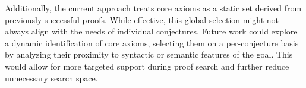 \documentclass[english,version-2020-11]{uzl-thesis}
\begin{document}
Additionally, the current approach treats core axioms as a static set derived from previously successful proofs. While effective, this global selection might not always align with the needs of individual conjectures. Future work could explore a dynamic identification of core axioms, selecting them on a per-conjecture basis by analyzing their proximity to syntactic or semantic features of the goal. This would allow for more targeted support during proof search and further reduce unnecessary search space.


%

% 
%
%
%
% 
% 
%
%
%
%
% 
% 
%
%
%
%
% 
%
%
\end{document}
